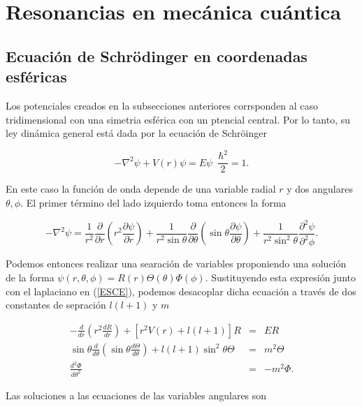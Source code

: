 \chapter{Resonancias en mecánica cuántica}

\section{Ecuación de Schrödinger en coordenadas esféricas}

Los potenciales creados en la subsecciones anteriores corrsponden al caso tridimensional con una simetria esférica con un ptencial central. Por lo tanto, su ley dinámica general está dada por la ecuación de Schröinger

\begin{equation}
-\nabla^2 \psi + V(r) \psi = E \psi \,\,\, \frac{\hbar^2}{2}= 1. \label{ESCE}
\end{equation}

En este caso la función de onda depende de una variable radial $r$ y dos angulares $\theta, \phi$. El primer término del lado izquierdo toma entonces la forma

\begin{equation*}
-\nabla^2 \psi = \frac{1}{r^2} \frac{\partial}{\partial r} \left(r^2 \frac{\partial \psi}{\partial r} \right) + \frac{1}{r^2 \sin \theta} \frac{\partial}{\partial \theta} \left(\sin \theta \frac{\partial \psi}{\partial \theta} \right) +  \frac{1}{r^2 \sin^2 \theta} \frac{\partial^2 \psi}{\partial^2 \phi}.
\end{equation*}

Podemos entonces realizar una searación de variables proponiendo una solución de la forma $\psi(r, \theta, \phi)= R(r)\Theta(\theta)\Phi(\phi)$. Sustituyendo esta expresión junto con el laplaciano en (\ref{ESCE}), podemos desacoplar dicha ecuación a través de dos constantes de sepración $l(l+1)$ y $m$

\begin{eqnarray}
-\frac{d}{dr}\left(r^2 \frac{d R}{dr} \right) + [r^2 V(r) +  l (l + 1)]R &=& E R \label{ESR}
\\
\sin{\theta}\frac{d}{d\theta}\left(\sin{\theta}\frac{d\Theta}{d\theta} \right)+l(l+1)\sin^2{\theta} \Theta &=& m^2 \Theta
\\
\frac{d^2 \Phi}{d \theta^2} &=& -m^2 \Phi.
\end{eqnarray}

Las soluciones a las ecuaciones de las variables angulares son


